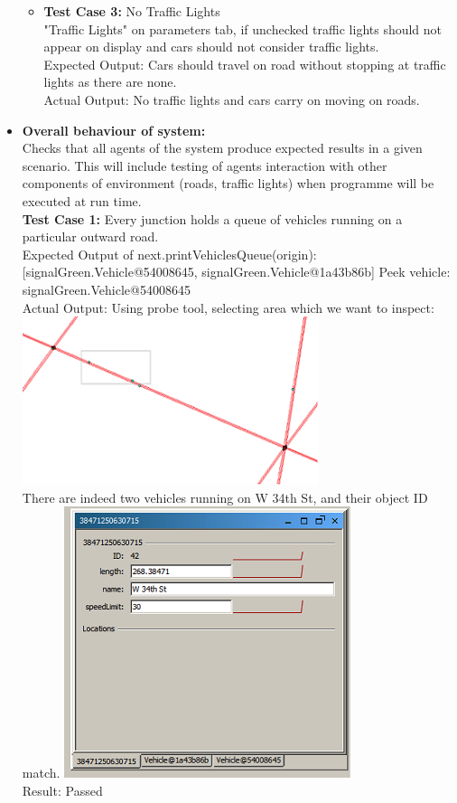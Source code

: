 \documentclass[11pt, oneside]{article}   	%
\begin{document}
\begin{itemize}
\begin{itemize}
\item \textbf{Test Case 3:} No Traffic Lights\hfill \\
"Traffic Lights" on parameters tab, if unchecked traffic lights should not appear on display and cars should not consider traffic lights.\hfill \\
Expected Output: Cars should travel on road without stopping at traffic lights as there are none.\hfill \\
Actual Output: No traffic lights and cars carry on moving on roads.
\end{itemize}
\item \textbf{Overall behaviour of system: }\hfill \\
Checks that all agents of the system produce expected results in a given scenario. This will include testing of agents interaction with other components of environment (roads, traffic lights) when programme will be executed at run time.\hfill \\
\textbf{Test Case 1:} Every junction holds a queue of vehicles running on a particular outward road.\hfill \\
Expected Output of next.printVehiclesQueue(origin):[signalGreen.Vehicle@54008645, signalGreen.Vehicle@1a43b86b] Peek vehicle: signalGreen.Vehicle@54008645\hfill \\
Actual Output: Using probe tool, selecting area which we want to inspect:\hfill \\
\includegraphics{RoadNetwork}\hfill \\
There are indeed two vehicles running on W 34th St, and their object ID match.
\includegraphics{Sim}\hfill \\
Result: Passed
\end{itemize}
\end{document}
